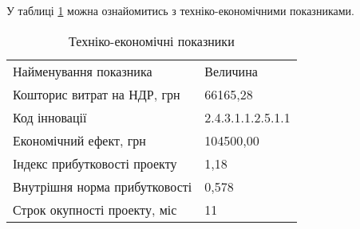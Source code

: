 У таблиці \ref{tab:summary} можна ознайомитись з техніко-економічними показниками.

\newpage

\begin{table}[h!]
	\captionstyle{ \raggedright}
	\caption{Техніко-економічні показники}\label{tab:summary}
	\begin{tabular}{| p{} | p{} |} 
		\hline
		Найменування показника & Величина \\
		\hlinewd{2pt}
		Кошторис витрат на НДР, грн & 66165,28 \\
		\hline
		Код інновації & 2.4.3.1.1.2.5.1.1 \\
		\hline
		Економічний ефект, грн & 104500,00 \\
		\hline
		Індекс прибутковості проекту & 1,18 \\
		\hline
		Внутрішня норма прибутковості & 0,578 \\
		\hline
		Строк окупності проекту, міс & 11 \\
		\hline
	\end{tabular}
\end{table}

